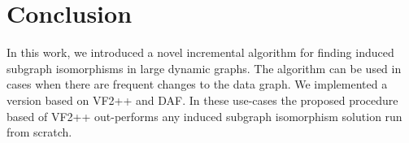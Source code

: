 \chapter{Conclusion}

In this work, we introduced a novel incremental algorithm for finding induced subgraph isomorphisms in large dynamic graphs.
The algorithm can be used in cases when there are frequent changes to the data graph. We implemented a version based on VF2++ 
and DAF. In these use-cases the proposed procedure based of VF2++ out-performs any induced subgraph isomorphism solution run 
from scratch.